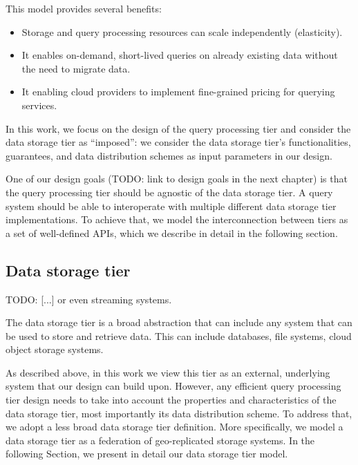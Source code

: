 This model provides several benefits:
\begin{itemize}
  \item Storage and query processing resources can scale independently (elasticity).
  \item It enables on-demand, short-lived queries on already existing data without the need to migrate data.
  \item It enabling cloud providers to implement fine-grained pricing for querying services.
\end{itemize}

In this work, we focus on the design of the query processing tier and consider the data storage tier as ``imposed'':
we consider the data storage tier's functionalities, guarantees, and data distribution schemes as input parameters in
our design.

One of our design goals
(TODO: link to design goals in the next chapter)
is that the query processing tier should be agnostic of the data storage tier.
A query system should be able to interoperate with multiple different data storage tier implementations.
To achieve that, we model the interconnection between tiers as a set of well-defined APIs, which we describe
in detail in the following section.


\subsection{Data storage tier}

TODO: [...] or even streaming systems.

The data storage tier is a broad abstraction that can include any system that can be used to store and retrieve data.
This can include databases, file systems, cloud object storage systems.

As described above, in this work we view this tier as an external, underlying system that our design can build upon.
However, any efficient query processing tier design needs to take into account the properties and characteristics of the
data storage tier, most importantly its data distribution scheme.
To address that, we adopt a less broad data storage tier definition.
More specifically, we model a data storage tier as a federation of geo-replicated storage systems.
In the following Section, we present in detail our data storage tier model.


